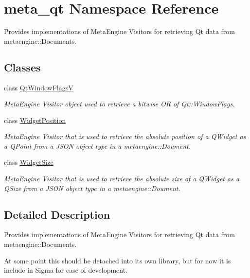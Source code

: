 \hypertarget{namespacemeta__qt}{}\section{meta\+\_\+qt Namespace Reference}
\label{namespacemeta__qt}


Provides implementations of Meta\+Engine Visitors for retrieving Qt data from metaengine\+::\+Documents.  


\subsection*{Classes}
\begin{DoxyCompactItemize}
\item 
class \hyperlink{classmeta__qt_1_1_qt_window_flags_v}{Qt\+Window\+Flags\+V}
\begin{DoxyCompactList}\small\item\em Meta\+Engine Visitor object used to retrieve a bitwise O\+R of Qt\+::\+Window\+Flags. \end{DoxyCompactList}\item 
class \hyperlink{classmeta__qt_1_1_widget_position}{Widget\+Position}
\begin{DoxyCompactList}\small\item\em Meta\+Engine Visitor that is used to retrieve the absolute position of a Q\+Widget as a Q\+Point from a J\+S\+O\+N object type in a metaengine\+::\+Doument. \end{DoxyCompactList}\item 
class \hyperlink{classmeta__qt_1_1_widget_size}{Widget\+Size}
\begin{DoxyCompactList}\small\item\em Meta\+Engine Visitor that is used to retrieve the absolute size of a Q\+Widget as a Q\+Size from a J\+S\+O\+N object type in a metaengine\+::\+Doument. \end{DoxyCompactList}\end{DoxyCompactItemize}


\subsection{Detailed Description}
Provides implementations of Meta\+Engine Visitors for retrieving Qt data from metaengine\+::\+Documents. 

At some point this should be detached into it\textquotesingle{}s own library, but for now it is include in Sigma for ease of development. 